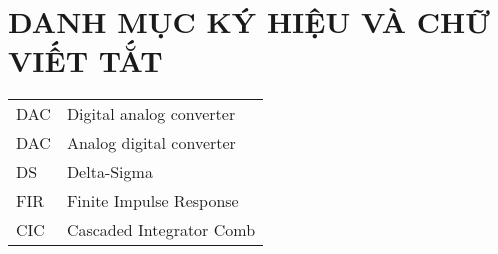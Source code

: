 \section*{DANH MỤC KÝ HIỆU VÀ CHỮ VIẾT TẮT}
 {}

\begin{tabular}{ l l }
\hspace{1cm} DAC & \hspace{4cm} Digital analog converter \\  
\hspace{1cm} DAC& \hspace{4cm} Analog digital converter    \\
\hspace{1cm} DS  & \hspace{4cm} Delta-Sigma\\
\hspace{1cm} FIR & \hspace{4cm} Finite Impulse Response \\  
\hspace{1cm} CIC & \hspace{4cm} Cascaded Integrator Comb \\  

\end{tabular}  

\newpage